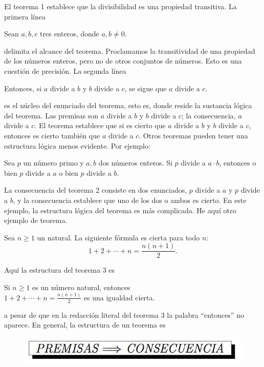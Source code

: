 El teorema 1 establece que la divisibilidad es una propiedad transitiva.
La primera línea
\begin{center}
    Sean $a,b,c$ tres enteros, donde $a,b \neq 0$.
\end{center}
delimita el alcance del teorema.
Proclamamos la transitividad de una propiedad de los números enteros, pero no de otros conjuntos de números.
Esto es una cuestión de precisión.
La segunda línea
\begin{center}
    Entonces, si $a$ divide a $b$ y $b$ divide a $c$, se sigue que $a$ divide a $c$.
\end{center}
es el núcleo del enunciado del teorema, esto es, donde reside la sustancia lógica del teorema.
Las premisas son $a$ divide a $b$ y $b$ divide a $c$; la consecuencia, $a$ divide a $c$.
El teorema establece que si es cierto que $a$ divide a $b$ y $b$ divide a $c$, entonces es cierto también que $a$ divide a $c$.
Otros teoremas pueden tener una estructura lógica menos evidente.
Por ejemplo:
\begin{theorem}
    Sea $p$ un número primo y $a,b$ dos números enteros.
    Si $p$ divide a $a\cdot b$, entonces o bien $p$ divide a $a$ o bien $p$ divide a $b$.
\end{theorem}
La consecuencia del teorema 2 consiste en dos enunciados, $p$ divide a $a$ y $p$ divide a $b$, y la consecuencia establece que uno de los dos o ambos es cierto.
En este ejemplo, la estructura lógica del teorema es más complicada.
He aquí otro ejemplo de teorema.
\begin{theorem}
    Sea $n \geq 1$ un natural.
    La siguiente fórmula es cierta para todo $n$:
    \[
        1 + 2 + \cdots + n = \frac{n(n + 1)}{2}.
    \]
\end{theorem}
Aquí la estructura del teorema 3 es
\begin{center}
    Si $n\geq 1$ es un número natural, entonces\\ $1 + 2 + \cdots + n = \frac{n(n + 1)}{2}$ es una igualdad cierta.
\end{center}
a pesar de que en la redacción literal del teorema 3 la palabra “entonces” no aparece.
En general, la estructura de un teorema es
\begin{figure}[H]
    \centering
    \includegraphics[width=0.6\linewidth]{images/Figura-premisas-consecuencia}\label{fig:figure}
\end{figure}
